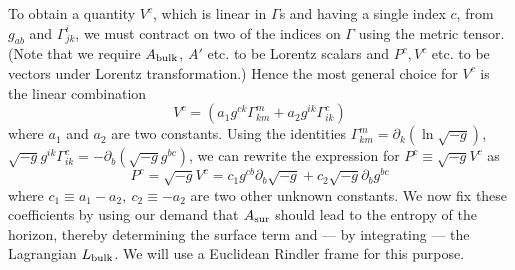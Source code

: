 \documentclass[12pt]{iopart}
\begin{document}
    
    To obtain a quantity $V^c$, which is linear in $\Gamma$s
     and having  a single index $c$, from $g_{ab} $ and $\Gamma^i_{jk}$,
     we must contract on two of the indices on $\Gamma$
    using the metric tensor. 
    (Note that we require $A_{\rm bulk}$, $A'$ etc. to be Lorentz scalars and $P^c, V^c$ etc.
    to be vectors under Lorentz transformation.)
    Hence the most general choice for $V^c$ is the linear combination
      \begin{equation}
    V^c =  \left(a_1 g^{ck} \Gamma^m_{km} +a_2 g^{ik} \Gamma^c_{ik}\right) 
    \label{defvc}
     \end{equation}
     where $a_1$ and $a_2$ are two constants. 
      Using the identities $\Gamma^m_{km} =\partial_k
     (\ln \sqrt{-g})$, \ $\sqrt{-g}g^{ik}\Gamma^c_{ik} = -\partial_b(\sqrt{-g}g^{bc})$,
     we can rewrite the expression for $P^c \equiv \sqrt{-g}V^c$ as 
     \begin{equation}
    P^c =\sqrt{-g}V^c=
    c_1g^{cb} \partial_b \sqrt{-g} +c_2 \sqrt{-g} \partial_b g^{bc}
    \label{defpc}
    \end{equation}
    where $c_1\equiv a_1 - a_2,\  c_2\equiv -a_2$ are two other unknown constants.
    We now fix these coefficients by using 
     our demand that $A_{\rm sur}$ should lead to the entropy of the horizon, thereby determining
      the surface term and --- by integrating --- the Lagrangian $L_{\rm bulk}$.
      We will use a Euclidean Rindler frame for this purpose.
   
\end{document}
